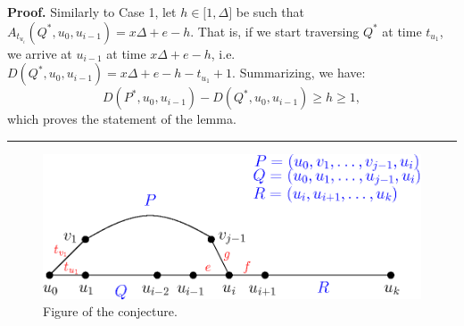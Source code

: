 \documentclass{article}
\newenvironment{proof}[1][Proof]{\noindent\textbf{#1.} }{\ \rule{0.5em}{0.5em}}
\begin{document}
\begin{proof}
Similarly to Case 1, let $h\in \lbrack 1,\Delta ]$ be such that $%
A_{t_{u_{i}}}(Q^{\ast },u_{0},u_{i-1})=x\Delta +e-h$. That is, if we start
traversing $Q^{\ast }$ at time $t_{u_{1}}$, we arrive at $u_{i-1}$ at time $%
x\Delta +e-h$, i.e. $D(Q^{\ast },u_{0},u_{i-1})=x\Delta +e-h-t_{u_{1}}+1$.
Summarizing, we have:%
\begin{equation*}
D(P^{\ast },u_{0},u_{i-1})-D(Q^{\ast },u_{0},u_{i-1})\geq h\geq 1,
\end{equation*}%
which proves the statement of the lemma.
\end{proof}

\medskip

\begin{figure}[htbp]
\centering
\includegraphics[width=0.6\linewidth]{conj-fig}
\caption{Figure of the conjecture.}
\label{conj-fig}
\end{figure}

%
%
%
%
\end{document}
